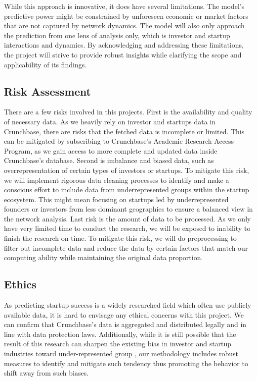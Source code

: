 \documentclass[a4paper,11pt]{article}
\begin{document}
While this approach is innovative, it does have several limitations.
The model’s predictive power might be constrained by unforeseen economic or market factors that are not captured by network dynamics. The model will also only approach the prediction from one lens of analysis only, which is investor and startup interactions and dynamics. By acknowledging and addressing these limitations, the project will strive to provide robust insights while clarifying the scope and applicability of its findings.

\subsection{Risk Assessment}
There are a few risks involved in this projects. First is the availability and quality of necessary data. As we heavily rely on investor and startups data in Crunchbase, there are risks that the fetched data is incomplete or limited. This can be mitigated by subscribing to Crunchbase's Academic Research Access Program, as we gain access to more complete and updated data inside Crunchbase's database. Second is imbalance and biased data, such as overrepresentation of certain types of investors or startups. To mitigate this risk, we will implement rigorous data cleaning processes to identify and make a conscious effort to include data from underrepresented groups within the startup ecosystem. This might mean focusing on startups led by underrepresented founders or investors from less dominant geographies to ensure a balanced view in the network analysis. Last risk is the amount of data to be processed. As we only have very limited time to conduct the research, we will be exposed to inability to finish the research on time. To mitigate this risk, we will do preprocessing to filter out incomplete data and reduce the data by certain factors that match our computing ability while maintaining the original data proportion.

\subsection{Ethics}
As predicting startup success is a widely researched field which often use publicly available data, it is hard to envisage any ethical concerns with this project. We can confirm that Crunchbase's data is aggregated and distributed legally and in line with data protection laws. Additionally, while it is still possible that the result of this research can sharpen the existing bias in investor and startup industries toward under-represented group \cite{ewens2020a} \cite{cumming2007a}, our methodology includes robust measures to identify and mitigate such tendency thus promoting the behavior to shift away from such biases.
\end{document}
